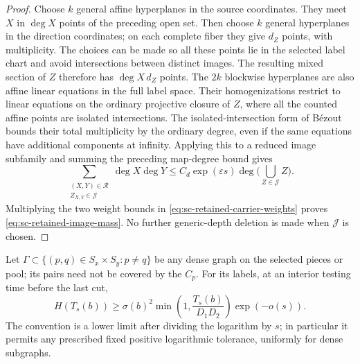 \begin{proof}
Choose $k$ general affine hyperplanes in the source coordinates.  They meet $X$ in $\deg X$ points of the preceding open set.  Then choose $k$ general hyperplanes in the direction coordinates; on each complete fiber they give $d_Z$ points, with multiplicity.  The choices can be made so all these points lie in the selected label chart and avoid intersections between distinct images.  The resulting mixed section of $Z$ therefore has $\deg X\,d_Z$ points.  The $2k$ blockwise hyperplanes are also affine linear equations in the full label space.  Their homogenizations restrict to linear equations on the ordinary projective closure of $Z$, where all the counted affine points are isolated intersections.  The isolated-intersection form of B\'ezout bounds their total multiplicity by the ordinary degree, even if the same equations have additional components at infinity. Applying this to a reduced image subfamily and summing the preceding map-degree bound gives
\[
 \sum_{\substack{(X,Y)\in\mathcal{R}\\Z_{X,Y}\in\mathcal{J}}}
       \deg X\deg Y
 \le C_d\exp(\varepsilon s)
       \deg\bigl(\bigcup_{Z\in\mathcal{J}}Z\bigr).
\]
Multiplying the two weight bounds in \eqref{eq:sc-retained-carrier-weights} proves \eqref{eq:sc-retained-image-mass}.  No further generic-depth deletion is made when $\mathcal{J}$ is chosen.
\end{proof}

\begin{lemma}\label{lem:sc-common-rank}
Let $\Gamma\subset\{(p,q)\in S_x\times S_y:p\ne q\}$ be any dense graph on the selected pieces or pool; its pairs need not be covered by the $C_p$. For its labels, at an interior testing time before the last cut,
\begin{equation}\label{eq:sc-label-rank}
 H(T_s(b))\ge
 \sigma(b)^2\min\left(1,\frac{T_s(b)}{D_1D_2}\right)
 \exp(-o(s)).
\end{equation}
The convention is a lower limit after dividing the logarithm by $s$; in particular it permits any prescribed fixed positive logarithmic tolerance, uniformly for dense subgraphs.
\end{lemma}

